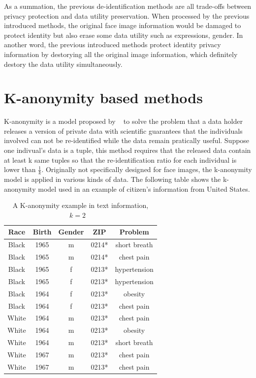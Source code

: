 	\par
	As a summation, the previous de-identification methods are all trade-offs between privacy protection and data utility preservation. When processed by the previous introduced methods, the original face image information would be damaged to protect identity but also erase some data utility such as expressions, gender. In another word, the previous introduced methods protect identity privacy information by destorying all the original image information, which definitely destory the data utility simultaneously. 

\section{K-anonymity based methods}
	K-anonymity is a model proposed by ~\cite{Sweeney02} to solve the problem that a data holder releases a version of private data with scientific guarantees that the individuals involved can not be re-identified while the data remain pratically useful. Suppose one indivual's data is a tuple, this method requires that the released data contain at least k same tuples so that the re-identification ratio for each individual is lower than $\frac{1}{k}$. Originally not specifically designed for face images, the k-anonymity model is applied in various kinds of data. The following table shows the k-anonymity model used in an example of citizen's information from United States. \newline
		\begin{table}[!htb]
		\centering
			\begin{tabular}{|c|c|c|c|c|}
				\hline
				\textbf{Race} & \textbf{Birth} & \textbf{Gender} & \textbf{ZIP} & \textbf{Problem} \\
				\hline
				Black & 1965 & m & 0214* & short breath \\
				\hline
				Black & 1965 & m & 0214* & chest pain \\
				\hline
				Black & 1965 & f & 0213* & hypertension \\
				\hline
				Black & 1965 & f & 0213* & hypertension \\
				\hline
				Black & 1964 & f & 0213* & obesity \\
				\hline
				Black & 1964 & f & 0213* & chest pain \\
				\hline
				White & 1964 & m & 0213* & chest pain \\
				\hline
				White & 1964 & m & 0213* & obesity \\
				\hline
				White & 1964 & m & 0213* & short breath \\
				\hline
				White & 1967 & m & 0213* & chest pain \\
				\hline
				White & 1967 & m & 0213* & chest pain \\
				\hline
			\end{tabular}
			\caption{A K-anonymity example in text information, $k = 2$ ~\cite{Sweeney02}} 
		\end{table}	

